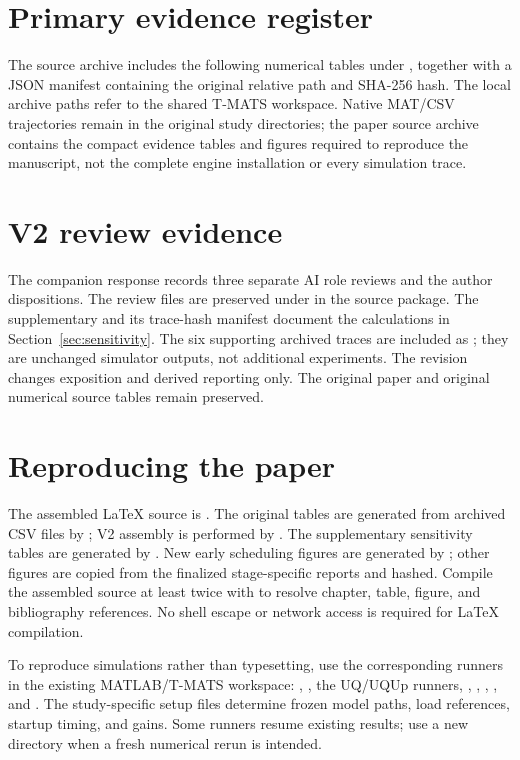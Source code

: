 \documentclass[11pt,a4paper,oneside]{report}
\begin{document}
\section{Primary evidence register}
The source archive includes the following numerical tables under , together with a JSON manifest containing the original relative path and SHA-256 hash. The local archive paths refer to the shared T-MATS workspace. Native MAT/CSV trajectories remain in the original study directories; the paper source archive contains the compact evidence tables and figures required to reproduce the manuscript, not the complete engine installation or every simulation trace.


\section{V2 review evidence}
The companion response records three separate AI role reviews and the author dispositions. The review files are preserved under  in the source package. The supplementary  and its trace-hash manifest document the calculations in Section~\ref{sec:sensitivity}. The six supporting archived traces are included as ; they are unchanged simulator outputs, not additional experiments. The revision changes exposition and derived reporting only. The original paper and original numerical source tables remain preserved.

\section{Reproducing the paper}
The assembled LaTeX source is . The original tables are generated from archived CSV files by ; V2 assembly is performed by . The supplementary sensitivity tables are generated by . New early scheduling figures are generated by ; other figures are copied from the finalized stage-specific reports and hashed. Compile the assembled source at least twice with  to resolve chapter, table, figure, and bibliography references. No shell escape or network access is required for LaTeX compilation.

To reproduce simulations rather than typesetting, use the corresponding runners in the existing MATLAB/T-MATS workspace: , , the UQ/UQUp runners, , , , , and . The study-specific setup files determine frozen model paths, load references, startup timing, and gains. Some runners resume existing results; use a new directory when a fresh numerical rerun is intended.
\end{document}
